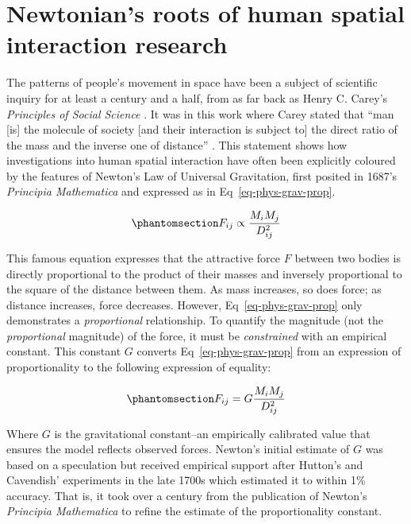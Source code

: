 \documentclass[
  10pt,
  letterpaper,
]{article}
\begin{document}
\section{Newtonian's roots of human spatial interaction
research}\label{newtonians-roots-of-human-spatial-interaction-research}

The patterns of people's movement in space have been a subject of
scientific inquiry for at least a century and a half, from as far back
as Henry C. Carey's \emph{Principles of Social Science}
\citep{careyPrinciplesSocialScience1858}. It was in this work where
Carey stated that ``man {[}is{]} the molecule of society {[}and their
interaction is subject to{]} the direct ratio of the mass and the
inverse one of distance'' \citep[pp.~37-38]{mckeanManual1883}. This
statement shows how investigations into human spatial interaction have
often been explicitly coloured by the features of Newton's Law of
Universal Gravitation, first posited in 1687's \emph{Principia
Mathematica} and expressed as in Eq~\ref{eq-phys-grav-prop}.

\begin{equation}\phantomsection\label{eq-phys-grav-prop}{
F_{ij} \propto \frac{M_i M_j} {D_{ij}^{2}}
}\end{equation}

This famous equation expresses that the attractive force \(F\) between
two bodies is directly proportional to the product of their masses and
inversely proportional to the square of the distance between them. As
mass increases, so does force; as distance increases, force decreases.
However, Eq~\ref{eq-phys-grav-prop} only demonstrates a
\emph{proportional} relationship. To quantify the magnitude (not the
\emph{proportional} magnitude) of the force, it must be
\emph{constrained} with an empirical constant. This constant \(G\)
converts Eq~\ref{eq-phys-grav-prop} from an expression of
proportionality to the following expression of equality:

\begin{equation}\phantomsection\label{eq-phys-grav}{
F_{ij} = G \frac{M_i M_j} {D_{ij}^{2}}
}\end{equation}

Where \(G\) is the gravitational constant--an empirically calibrated
value that ensures the model reflects observed forces. Newton's initial
estimate of \(G\) was based on a speculation but received empirical
support after Hutton's and Cavendish' experiments in the late 1700s
\citep{hutton_xxxiii_1778, cavendish_xxi_1798} which estimated it to
within 1\% accuracy. That is, it took over a century from the
publication of Newton's \emph{Principia Mathematica} to refine the
estimate of the proportionality constant.
\end{document}
